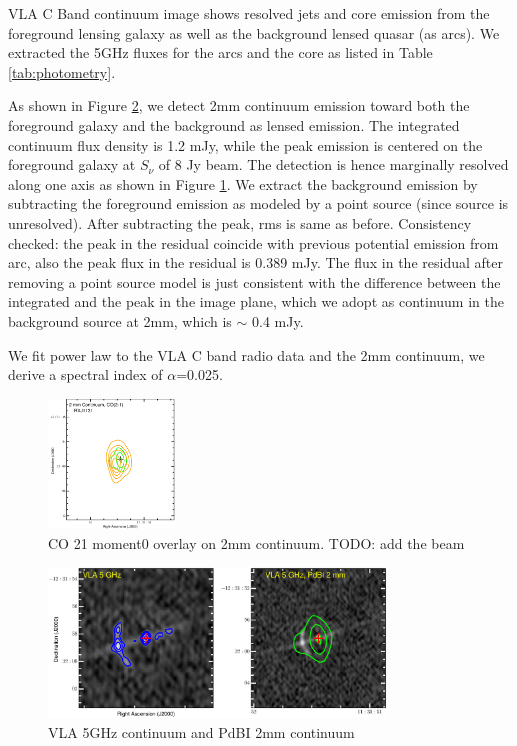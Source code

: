 VLA C Band continuum image shows resolved jets and core emission from the foreground lensing galaxy as well as the 
background
lensed quasar (as arcs). We extracted the 5GHz fluxes for the arcs and the core as listed in Table \ref{tab:photometry}.

As shown in Figure \ref{fig:cont}, we detect 2mm continuum emission toward both the foreground galaxy and the background 
as lensed
emission.
The integrated continuum flux density is 1.2 mJy, while the peak emission is centered on the foreground galaxy at 
$S_\nu$ of 8 \micron Jy beam\pmOne.  The detection is hence marginally resolved along one axis as shown in Figure \ref{fig:contco21}.
We extract the background emission by subtracting the foreground emission as modeled by a point source (since source is 
unresolved).
After subtracting the peak, rms is same as before.
Consistency checked: the peak in the residual coincide with previous potential emission from arc, also the peak flux in the 
residual is 0.389 mJy.
The flux in the residual after removing a point source model is just consistent with the difference between the integrated and 
the peak in the
image plane, which we adopt as continuum in the background source at 2mm, which is $\sim$ 0.4 mJy.

We fit power law to the VLA C band radio data and the 2mm continuum, we derive a spectral index of $\alpha$=0.025.
\begin{figure}[!htbp]
\centering
\includegraphics[width=0.3\textwidth]{../Figures/ContCO21.eps}
\caption{CO 21 moment0 overlay on 2mm continuum.  %
TODO: add the beam
 \label{fig:contco21}}
\end{figure}

\begin{figure}[!htbp]
\centering
\includegraphics[width=0.8\textwidth]{../Figures/Cont2mm_5GHz_double.eps}
\caption{VLA 5GHz continuum and PdBI 2mm continuum
 \label{fig:cont}}
\end{figure}


